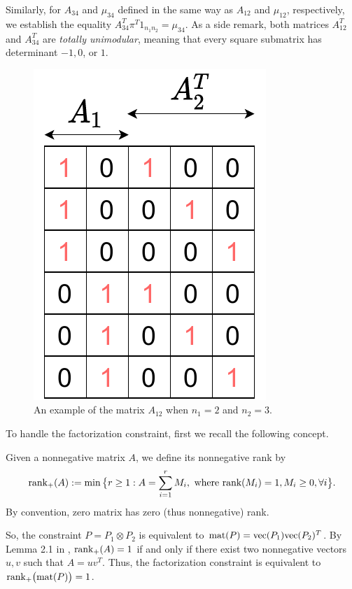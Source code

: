 Similarly, for $A_{34}$ and $\mu_{34}$ defined in the same way as $A_{12}$ and
$\mu_{12}$, respectively, we establish the equality $A_{34}^T \pi^T 1_{n_1 n_2} = \mu_{34}$.
As a side remark, both matrices $A_{12}^T$ and $A_{34}^T$ are \textit{totally unimodular},
meaning that every square submatrix has determinant $-1, 0$, or $1$.
\begin{figure}[h]
  \centering
  \includegraphics[height=0.25\textheight,keepaspectratio]{./Chapitre2/fig/matrix.pdf}
  \caption{An example of the matrix $A_{12}$ when $n_1=2$ and $n_2=3$.}
  \label{fig:matrix_a12}
\end{figure}
To handle the factorization constraint, first we recall the following concept.
\begin{definition}
  Given a nonnegative matrix $A$, we define its nonnegative rank by
  \begin{equation}
    \text{rank}_{+}(A):= \min \big\{ r \geq 1: A = \sum_{i=1}^r M_i, \text{ where } \text{rank}(M_i) = 1, M_i \geq 0, \forall i \big\}.
  \end{equation}
  By convention, zero matrix has zero (thus nonnegative) rank.
\end{definition}
So, the constraint $P = P_1 \otimes P_2$ is equivalent to $\text{mat}(P) = \text{vec}(P_1) \text{vec}(P_2)^T$.
By Lemma 2.1 in \citep{Joel93}, $\text{rank}_+(A) = 1$ if and only if there exist two nonnegative vectors $u,v$ such that
$A = u v^T$. Thus, the factorization constraint is equivalent to $\text{rank}_+\big( \text{mat}(P) \big) = 1$.


